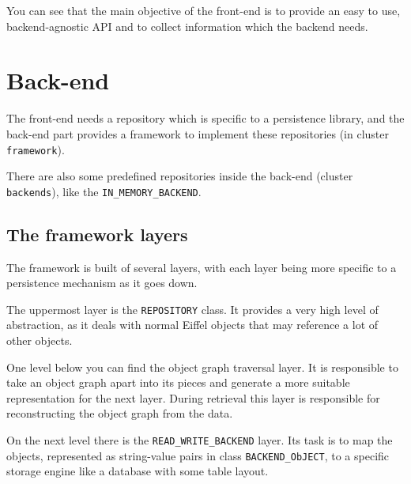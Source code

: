 \documentclass[a4paper,12pt]{report}
\begin{document}
You can see that the main objective of the front-end is to provide an easy to use, backend-agnostic API and to collect information which the backend needs.

% 


\section{Back-end}

The front-end needs a repository which is specific to a persistence library, and the back-end part provides a framework to implement these repositories (in cluster \lstinline!framework!).

There are also some predefined repositories inside the back-end (cluster \lstinline!backends!), like the \lstinline!IN_MEMORY_BACKEND!.

\subsection{The framework layers}

The framework is built of several layers, with each layer being more specific to a persistence mechanism as it goes down.

The uppermost layer is the \lstinline!REPOSITORY! class. 
It provides a very high level of abstraction, as it deals with normal Eiffel objects that may reference a lot of other objects.

One level below you can find the object graph traversal layer.
It is responsible to take an object graph apart into its pieces and generate a more suitable representation for the next layer.
During retrieval this layer is responsible for reconstructing the object graph from the data.

On the next level there is the \lstinline!READ_WRITE_BACKEND! layer.
Its task is to map the objects, represented as string-value pairs in class \lstinline!BACKEND_ObJECT!, 
to a specific storage engine like a database with some table layout.
\end{document}
